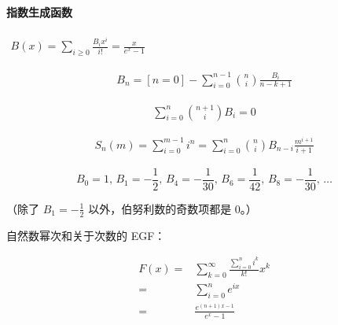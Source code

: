 \documentclass[a4paper, twoside]{article}
\begin{document}
            \paragraph{指数生成函数} $\begin{aligned} B(x)=\sum_{i\ge 0}\frac{B_i x^i}{i!}=\frac x{e^x-1} \end{aligned}$
    
            $$ \begin{aligned}B_n=[n=0]-\sum_{i=0}^{n-1}{n\choose i}\frac{B_i}{n-k+1}\end{aligned} $$
            
            $$ \begin{aligned}\sum_{i=0}^n{n+1\choose i}B_i=0\end{aligned} $$
            
            $$ \begin{aligned}S_n(m)=\sum_{i=0}^{m-1}i^n=\sum_{i=0}^n{n\choose i}B_{n-i}\frac{m^{i+1}}{i+1}\end{aligned} $$
            
            $$ B_0 = 1,\, B_1 = -\frac 1 2,\, B_4 = -\frac 1 {30},\, B_6 = \frac 1 {42},\, B_8 = -\frac 1{30},\, \dots $$
            
            （除了 $B_1 = -\frac 1 2$ 以外，伯努利数的奇数项都是 $0$。）
            
            自然数幂次和关于次数的 EGF：
            
            $$ \begin{aligned} F(x)=&\sum_{k=0}^\infty \frac{\sum_{i=0}^n i^k}{k!}x^k\\ =&\sum_{i=0}^n e^{ix}\\ =&\frac{e^{(n+1)x-1}}{e^x-1} \end{aligned} $$
            
\end{document}
